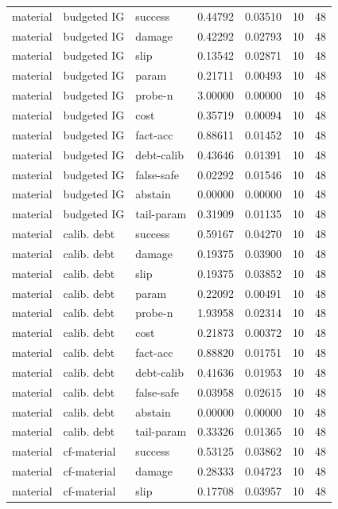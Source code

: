 \documentclass{article}
\begin{document}
\begin{center}
\begin{longtable}{lllllll}
material & budgeted IG & success & 0.44792 & 0.03510 & 10 & 48 \\
material & budgeted IG & damage & 0.42292 & 0.02793 & 10 & 48 \\
material & budgeted IG & slip & 0.13542 & 0.02871 & 10 & 48 \\
material & budgeted IG & param & 0.21711 & 0.00493 & 10 & 48 \\
material & budgeted IG & probe-n & 3.00000 & 0.00000 & 10 & 48 \\
material & budgeted IG & cost & 0.35719 & 0.00094 & 10 & 48 \\
material & budgeted IG & fact-acc & 0.88611 & 0.01452 & 10 & 48 \\
material & budgeted IG & debt-calib & 0.43646 & 0.01391 & 10 & 48 \\
material & budgeted IG & false-safe & 0.02292 & 0.01546 & 10 & 48 \\
material & budgeted IG & abstain & 0.00000 & 0.00000 & 10 & 48 \\
material & budgeted IG & tail-param & 0.31909 & 0.01135 & 10 & 48 \\
material & calib. debt & success & 0.59167 & 0.04270 & 10 & 48 \\
material & calib. debt & damage & 0.19375 & 0.03900 & 10 & 48 \\
material & calib. debt & slip & 0.19375 & 0.03852 & 10 & 48 \\
material & calib. debt & param & 0.22092 & 0.00491 & 10 & 48 \\
material & calib. debt & probe-n & 1.93958 & 0.02314 & 10 & 48 \\
material & calib. debt & cost & 0.21873 & 0.00372 & 10 & 48 \\
material & calib. debt & fact-acc & 0.88820 & 0.01751 & 10 & 48 \\
material & calib. debt & debt-calib & 0.41636 & 0.01953 & 10 & 48 \\
material & calib. debt & false-safe & 0.03958 & 0.02615 & 10 & 48 \\
material & calib. debt & abstain & 0.00000 & 0.00000 & 10 & 48 \\
material & calib. debt & tail-param & 0.33326 & 0.01365 & 10 & 48 \\
material & cf-material & success & 0.53125 & 0.03862 & 10 & 48 \\
material & cf-material & damage & 0.28333 & 0.04723 & 10 & 48 \\
material & cf-material & slip & 0.17708 & 0.03957 & 10 & 48 \\
\bottomrule
\end{longtable}
\renewcommand{\arraystretch}{1.0}
\end{center}
\end{document}
